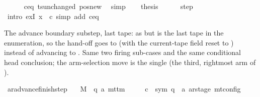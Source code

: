 \begin{isabellebody}
\ \ \ \ \isamarkupfalse%
\ c{\isacharprime}{\kern0pt}{\isacharunderscore}{\kern0pt}eq\ ts{\isacharunderscore}{\kern0pt}unchanged\ pos{\isacharunderscore}{\kern0pt}new\ \isamarkupfalse%
\ simp\isanewline
\ \ \isamarkupfalse%
\ {\isacharquery}{\kern0pt}thesis\isanewline
\ \ \ \ \isamarkupfalse%
\ step\ \isamarkupfalse%
\ {\isacharparenleft}{\kern0pt}intro\ exI{\isacharbrackleft}{\kern0pt}\ x\ {\isacharequal}{\kern0pt}\ {\isacharquery}{\kern0pt}c{\isacharprime}{\kern0pt}{\isacharprime}{\kern0pt}{\isacharbrackright}{\kern0pt}{\isacharparenright}{\kern0pt}\ {\isacharparenleft}{\kern0pt}simp\ add{\isacharcolon}{\kern0pt}\ c{\isacharprime}{\kern0pt}{\isacharunderscore}{\kern0pt}eq{\isacharparenright}{\kern0pt}\isanewline
{}\isamarkupfalse%
%
\endisatagproof
{\isafoldproof}%
%
\isadelimproof
%
\endisadelimproof
%
\begin{isamarkuptext}%
The advance boundary substep, last tape: as
   but  is the last tape in
  the enumeration, so the hand-off goes to  (with the
  current-tape field reset to ) instead of advancing to
  .  Same two firing sub-cases and the same conditional
  head conclusion; the arm-selection move is the single 
  (the third, rightmost arm of ).%
\end{isamarkuptext}\isamarkuptrue%
\isamarkupfalse%
\ ar{\isacharunderscore}{\kern0pt}advance{\isacharunderscore}{\kern0pt}finish{\isacharunderscore}{\kern0pt}step{\isacharcolon}{\kern0pt}\isanewline
\ \ \ M\ {\isacharcolon}{\kern0pt}{\isacharcolon}{\kern0pt}\ {\isachardoublequoteopen}{\isacharparenleft}{\kern0pt}{\isacharprime}{\kern0pt}q{\isacharcomma}{\kern0pt}\ {\isacharprime}{\kern0pt}a{\isacharparenright}{\kern0pt}\ mttm{\isachardoublequoteclose}\isanewline
\ \ \ \ \ c{\isacharprime}{\kern0pt}\ {\isacharcolon}{\kern0pt}{\isacharcolon}{\kern0pt}\ {\isachardoublequoteopen}{\isacharparenleft}{\kern0pt}sym{}{\isacharcomma}{\kern0pt}\ {\isacharprime}{\kern0pt}q\ {\isasymtimes}\ {\isacharprime}{\kern0pt}a\ ar{\isacharunderscore}{\kern0pt}stage{\isacharparenright}{\kern0pt}\ mt{\isacharunderscore}{\kern0pt}config{\isachardoublequoteclose}\isanewline

\end{isabellebody}
